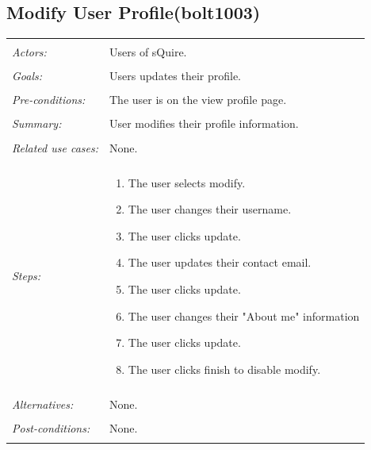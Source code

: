 \documentclass[11pt]{report}
\begin{document}
\subsection{Modify User Profile(bolt1003)}
\begin{tabular}{ p{2cm} p{12cm} }
 \hline
 \\
 \textit{Actors:} & Users of sQuire. \\ 
 \\
 \textit{Goals:} & Users updates their profile. \\
 \\
 \textit{Pre-conditions:} & The user is on the view profile page. \\
 \\
 \textit{Summary:} & User modifies their profile information.\\ 
 \\
 \textit{Related use cases:} & None. \\ 
 \\
 \textit{Steps:} & \begin{enumerate}
  \item The user selects modify. 
  \item The user changes their username.
  \item The user clicks update.
  \item The user updates their contact email.
  \item The user clicks update.
  \item The user changes their "About me" information
  \item The user clicks update.
  \item The user clicks finish to disable modify.
 \end{enumerate} \\
 \\
 \textit{Alternatives:} & None. \\
 \\
 \textit{Post-conditions:} & None. \\
 \\
\hline
\end{tabular}
\end{document}
